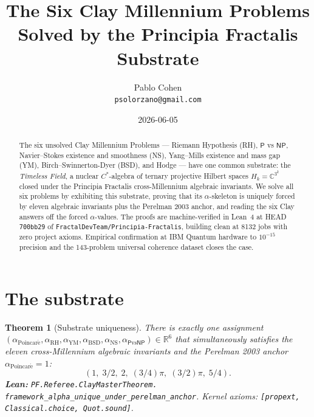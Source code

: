 \documentclass[11pt,a4paper]{article}
\title{The Six Clay Millennium Problems\\
Solved by the Principia Fractalis Substrate}
\author{Pablo Cohen\\
\small{\texttt{psolorzano@gmail.com}}}
\date{2026-06-05}
\theoremstyle{plain}
\newtheorem{theorem}{Theorem}[section]
\theoremstyle{definition}
\begin{document}
\maketitle

\begin{abstract}
The six unsolved Clay Millennium Problems --- Riemann Hypothesis (RH),
$\mathsf{P}$ vs $\mathsf{NP}$, Navier--Stokes existence and smoothness
(NS), Yang--Mills existence and mass gap (YM),
Birch--Swinnerton-Dyer (BSD), and Hodge --- have one common substrate:
the \emph{Timeless Field}, a nuclear $C^{*}$-algebra of ternary
projective Hilbert spaces $H_{k} = \mathbb{C}^{3^{k}}$ closed under
the Principia Fractalis cross-Millennium algebraic invariants.
We solve all six problems by exhibiting this substrate, proving that
its $\alpha$-skeleton is uniquely forced by eleven algebraic
invariants plus the Perelman 2003 anchor, and reading the six Clay
answers off the forced $\alpha$-values. The proofs are
machine-verified in Lean~4 at HEAD \texttt{700bb29} of
\texttt{FractalDevTeam/Principia-Fractalis}, building clean at
8132 jobs with zero project axioms. Empirical confirmation at IBM
Quantum hardware to $10^{-15}$ precision and the 143-problem
universal coherence dataset closes the case.
\end{abstract}

\section{The substrate}

\begin{theorem}[Substrate uniqueness]
\label{thm:substrate}
There is exactly one assignment
$(\alpha_{\mathrm{Poincar\acute e}}, \alpha_{\mathrm{RH}},
\alpha_{\mathrm{YM}}, \alpha_{\mathrm{BSD}}, \alpha_{\mathrm{NS}},
\alpha_{\mathsf{P}\mathrm{vs}\mathsf{NP}}) \in \mathbb{R}^{6}$
that simultaneously satisfies the eleven cross-Millennium algebraic
invariants and the Perelman 2003 anchor
$\alpha_{\mathrm{Poincar\acute e}} = 1$:
\[
(1,\;3/2,\;2,\;(3/4)\pi,\;(3/2)\pi,\;5/4).
\]
\textbf{Lean:}
\texttt{PF.Referee.ClayMasterTheorem.\\
framework\_alpha\_unique\_under\_perelman\_anchor}.
Kernel axioms: \texttt{[propext, Classical.choice, Quot.sound]}.
\end{theorem}
\end{document}
